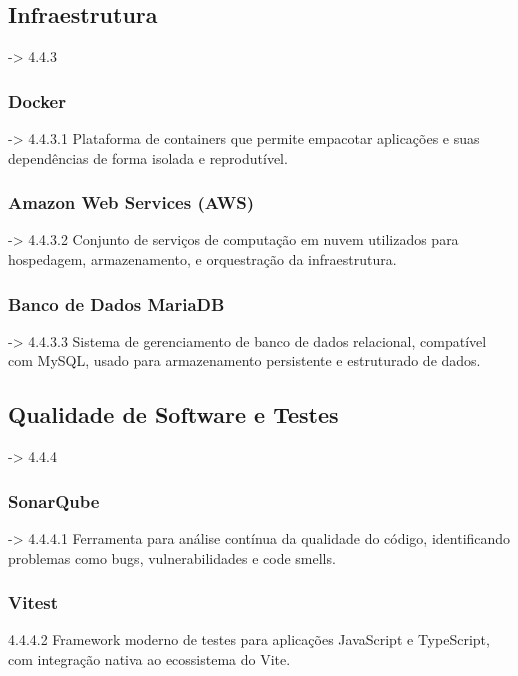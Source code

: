 \subsection{Infraestrutura} -> 4.4.3

\subsubsection{Docker} -> 4.4.3.1
Plataforma de containers que permite empacotar aplicações e suas dependências de forma isolada e reprodutível.

\subsubsection{Amazon Web Services (AWS)} -> 4.4.3.2
Conjunto de serviços de computação em nuvem utilizados para hospedagem, armazenamento, e orquestração da infraestrutura.

\subsubsection{Banco de Dados MariaDB} -> 4.4.3.3
Sistema de gerenciamento de banco de dados relacional, compatível com MySQL, usado para armazenamento persistente e estruturado de dados.

\subsection{Qualidade de Software e Testes} -> 4.4.4

\subsubsection{SonarQube} -> 4.4.4.1
Ferramenta para análise contínua da qualidade do código, identificando problemas como bugs, vulnerabilidades e code smells.

\subsubsection{Vitest} 4.4.4.2
Framework moderno de testes para aplicações JavaScript e TypeScript, com integração nativa ao ecossistema do Vite.
